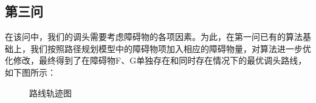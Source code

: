 \documentclass{article}
\begin{document}
	\subsection{第三问}
	在该问中，我们的调头需要考虑障碍物的各项因素。为此，在第一问已有的算法基础上，我们按照路径规划模型中的障碍物项加入相应的障碍物量，对算法进一步优化修改，最终得到了在障碍物F、G单独存在和同时存在情况下的最优调头路线，如下图所示：
	\begin{figure}[!h]
	\centering 
	\caption{路线轨迹图}
	\end{figure}

	\newpage
\end{document}
